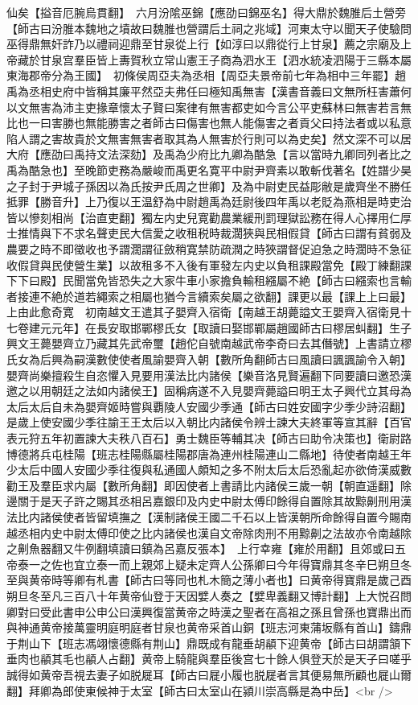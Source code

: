 仙矣【搤音厄腕烏貫翻】　六月汾隂巫錦【應劭曰錦巫名】得大鼎於魏脽后土營旁【師古曰汾脽本魏地之墳故曰魏脽也營謂后土祠之兆域】河東太守以聞天子使驗問巫得鼎無奸詐乃以禮祠迎鼎至甘泉從上行【如淳曰以鼎從行上甘泉】薦之宗廟及上帝藏於甘泉宫羣臣皆上夀賀秋立常山憲王子商為泗水王【泗水統凌泗陽于三縣本屬東海郡帝分為王國】　初條侯周亞夫為丞相【周亞夫景帝前七年為相中三年罷】趙禹為丞相史府中皆稱其廉平然亞夫弗任曰極知禹無害【漢書音義曰文無所枉害蕭何以文無害為沛主吏掾章懷太子賢曰案律有無害都吏如今言公平吏蘇林曰無害若言無比也一曰害勝也無能勝害之者師古曰傷害也無人能傷害之者貢父曰持法者或以私意陷人謂之害故貴於文無害無害者取其為人無害於行則可以為史矣】然文深不可以居大府【應劭曰禹持文法深劾】及禹為少府比九卿為酷急【言以當時九卿同列者比之禹為酷急也】至晚節吏務為嚴峻而禹更名寛平中尉尹齊素以敢斬伐著名【姓譜少昊之子封于尹城子孫因以為氏按尹氏周之世卿】及為中尉吏民益彫敝是歲齊坐不勝任抵罪【勝音升】上乃復以王温舒為中尉趙禹為廷尉後四年禹以老貶為燕相是時吏治皆以慘刻相尚【治直吏翻】獨左内史兒寛勸農業緩刑罰理獄訟務在得人心擇用仁厚士推情與下不求名聲吏民大信愛之收租税時裁濶狹與民相假貸【師古曰謂有貧弱及農要之時不即徵收也予謂濶謂征斂稍寛禁防疏潤之時狹謂督促迫急之時濶時不急征收假貸與民使營生業】以故租多不入後有軍發左内史以負租課殿當免【殿丁練翻課下下曰殿】民聞當免皆恐失之大家牛車小家擔負輸租繦屬不絶【師古曰繦索也言輸者接連不絶於道若繩索之相屬也猶今言續索矣屬之欲翻】課更以最【課上上曰最】上由此愈奇寛　初南越文王遣其子嬰齊入宿衛【南越王胡薨謚文王嬰齊入宿衛見十七卷建元元年】在長安取邯鄲樛氏女【取讀曰娶邯鄲屬趙國師古曰樛居虯翻】生子興文王薨嬰齊立乃藏其先武帝璽【趙佗自號南越武帝李奇曰去其僭號】上書請立樛氏女為后興為嗣漢數使使者風諭嬰齊入朝【數所角翻師古曰風讀曰諷諷諭令入朝】嬰齊尚樂擅殺生自恣懼入見要用漢法比内諸侯【樂音洛見賢遍翻下同要讀曰邀恐漢邀之以用朝廷之法如内諸侯王】固稱病遂不入見嬰齊薨謚曰明王太子興代立其母為太后太后自未為嬰齊姬時嘗與覇陵人安國少季通【師古曰姓安國字少季少詩沼翻】是歲上使安國少季往諭王王太后以入朝比内諸侯令辨士諫大夫終軍等宣其辭【百官表元狩五年初置諫大夫秩八百石】勇士魏臣等輔其决【師古曰助令决策也】衛尉路博德將兵屯桂陽【班志桂陽縣屬桂陽郡唐為連州桂陽連山二縣地】待使者南越王年少太后中國人安國少季往復與私通國人頗知之多不附太后太后恐亂起亦欲倚漢威數勸王及羣臣求内屬【數所角翻】即因使者上書請比内諸侯三歲一朝【朝直遥翻】除邊關于是天子許之賜其丞相呂嘉銀印及内史中尉太傅印餘得自置除其故黥劓刑用漢法比内諸侯使者皆留填撫之【漢制諸侯王國二千石以上皆漢朝所命餘得自置今賜南越丞相内史中尉太傅印使之比内諸侯也漢自文帝除肉刑不用黥劓之法故亦令南越除之劓魚器翻又牛例翻填讀曰鎮為呂嘉反張本】　上行幸雍【雍於用翻】且郊或曰五帝泰一之佐也宜立泰一而上親郊上疑未定齊人公孫卿曰今年得寶鼎其冬辛巳朔旦冬至與黄帝時等卿有札書【師古曰等同也札木簡之薄小者也】曰黄帝得寶鼎是歲己酉朔旦冬至凡三百八十年黄帝仙登于天因嬖人奏之【嬖卑義翻又博計翻】上大悦召問卿對曰受此書申公申公曰漢興復當黄帝之時漢之聖者在高祖之孫且曾孫也寶鼎出而與神通黄帝接萬靈明庭明庭者甘泉也黄帝采首山銅【班志河東蒲坂縣有首山】鑄鼎于荆山下【班志馮翊懷德縣有荆山】鼎既成有龍垂胡䫇下迎黄帝【師古曰胡謂頷下垂肉也䫇其毛也䫇人占翻】黄帝上騎龍與羣臣後宫七十餘人俱登天於是天子曰嗟乎誠得如黄帝吾視去妻子如脱屣耳【師古曰屣小履也脱屣者言其便易無所顧也屣山爾翻】拜卿為郎使東候神于太室【師古曰太室山在潁川崇高縣是為中岳】<br />
